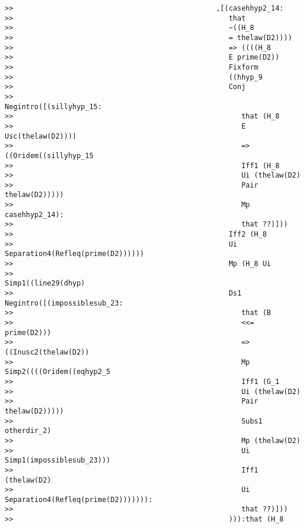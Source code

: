 \documentclass[12pt]{article}
\begin{document}
\begin{verbatim}
>>                                                ,[(casehhyp2_14:
>>                                                   that
>>                                                   ~((H_8
>>                                                   = thelaw(D2))))
>>                                                   => ((((H_8
>>                                                   E prime(D2))
>>                                                   Fixform
>>                                                   ((hhyp_9
>>                                                   Conj
>>                                                   Negintro([(sillyhyp_15:
>>                                                      that (H_8
>>                                                      E Usc(thelaw(D2))))
>>                                                      => ((Oridem((sillyhyp_15
>>                                                      Iff1 (H_8
>>                                                      Ui (thelaw(D2)
>>                                                      Pair thelaw(D2)))))
>>                                                      Mp casehhyp2_14):
>>                                                      that ??)]))
>>                                                   Iff2 (H_8
>>                                                   Ui Separation4(Refleq(prime(D2))))))
>>                                                   Mp (H_8 Ui
>>                                                   Simp1((line29(dhyp)
>>                                                   Ds1 Negintro([(impossiblesub_23:
>>                                                      that (B
>>                                                      <<= prime(D2)))
>>                                                      => ((Inusc2(thelaw(D2))
>>                                                      Mp Simp2((((Oridem((eqhyp2_5
>>                                                      Iff1 (G_1
>>                                                      Ui (thelaw(D2)
>>                                                      Pair thelaw(D2)))))
>>                                                      Subs1 otherdir_2)
>>                                                      Mp (thelaw(D2)
>>                                                      Ui Simp1(impossiblesub_23)))
>>                                                      Iff1 (thelaw(D2)
>>                                                      Ui Separation4(Refleq(prime(D2))))))):
>>                                                      that ??)]))
>>                                                   ))):that (H_8

\end{verbatim}
\end{document}
